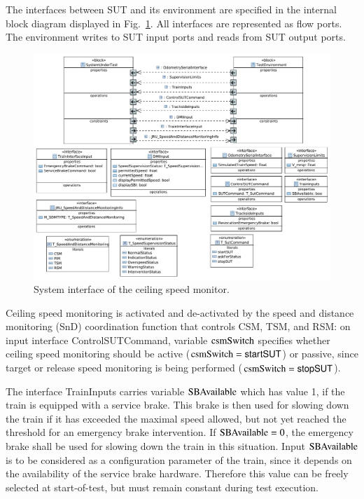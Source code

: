 The interfaces between SUT and its environment are specified in the
internal block diagram displayed in Fig.~\ref{fig:sysif}. All
interfaces are represented as flow ports. The environment writes to
SUT input ports and reads from SUT output ports.

\begin{figure}
 \centering
 \includegraphics[width=\textwidth]{CSM-Interface.pdf} 
\caption{System interface of the ceiling speed monitor.}
 \label{fig:sysif}
 \end{figure}


 
Ceiling speed monitoring is activated and de-activated by the speed
and distance monitoring (SnD) coordination function that controls CSM,
TSM, and RSM: on input interface {\sf ControlSUTCommand}, variable $\text{csmSwitch}$
specifies whether ceiling speed monitoring should be active
($\text{csmSwitch}=\mathsf{startSUT}$) or passive, since target or release speed monitoring is
being performed ($\text{csmSwitch} = \mathsf{stopSUT}$). 

The interface {\sf TrainInputs} carries
variable $\text{SBAvailable}$ which has value 1, if the train is equipped with a
service brake. This brake is then used for slowing down the train if
it has exceeded the maximal speed allowed, but not yet reached the
threshold for an emergency brake intervention. If $\text{SBAvailable} = 0$, the
emergency brake shall be used for slowing down the train in this
situation. Input $\text{SBAvailable}$ is to be considered as a configuration
parameter of the train, since it depends on the availability of the
service brake hardware. Therefore this value can be freely selected at
start-of-test, but must remain constant during test execution.

